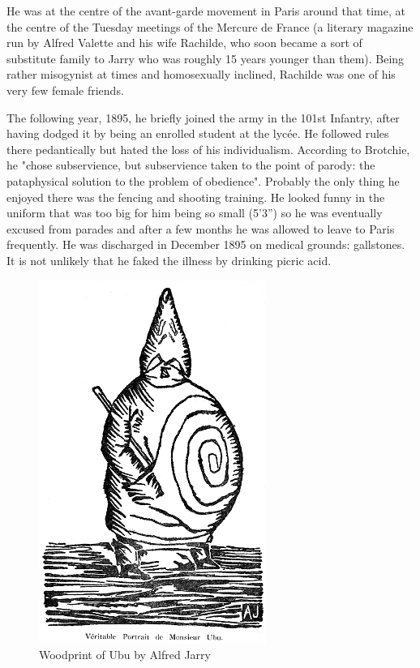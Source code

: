 He was at the centre of the avant-garde movement in Paris around that time, at the centre of the Tuesday meetings of the Mercure de France (a literary magazine run by Alfred Valette and his wife Rachilde, who soon became a sort of substitute family to Jarry who was roughly 15 years younger than them). Being rather misogynist at times and homosexually inclined, Rachilde was one of his very few female friends.

The following year, 1895, he briefly joined the army in the 101st Infantry, after having dodged it by being an enrolled student at the lycée. He followed rules there pedantically but hated the loss of his individualism. According to Brotchie, he "chose subservience, but subservience taken to the point of parody: the pataphysical solution to the problem of obedience"\citep{Brotchie2011}. Probably the only thing he enjoyed there was the fencing and shooting training. He looked funny in the uniform that was too big for him being so small (5'3'') so he was eventually excused from parades and after a few months he was allowed to leave to Paris frequently. He was discharged in December 1895 on medical grounds: gallstones. It is not unlikely that he faked the illness by drinking picric acid.

\begin{figure}[htb] %
  \centering
  \includegraphics[height=0.3\textheight]{images/ubu}
  \caption[Ubu]{Woodprint of Ubu by Alfred Jarry}
  \label{fig:UBU}
\end{figure}

